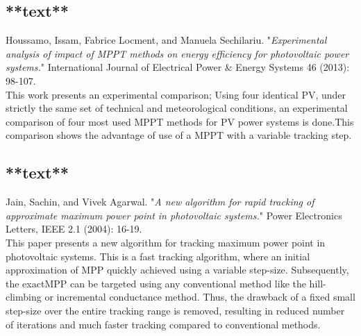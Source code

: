 





\subsection{**text**\cite{houssamo2013experimental}}

Houssamo, Issam, Fabrice Locment, and Manuela Sechilariu. "\textit{Experimental analysis of impact of MPPT methods on energy efficiency for photovoltaic power systems.}" International Journal of Electrical Power \& Energy Systems 46 (2013): 98-107.\\

This work presents an experimental comparison; Using four identical PV, under strictly the same set of technical and meteorological conditions, an experimental comparison  of four most used MPPT methods for PV power systems is done.This comparison shows the advantage of use of a MPPT with a variable tracking step.\\  

\subsection{**text**\cite{jain2004new}}
Jain, Sachin, and Vivek Agarwal. "\textit{A new algorithm for rapid tracking of approximate maximum power point in photovoltaic systems.}" Power Electronics Letters, IEEE 2.1 (2004): 16-19.\\

This paper presents a new algorithm for tracking maximum power point in photovoltaic systems. This is a fast tracking algorithm, where an initial approximation of \ac{MPP} quickly achieved using a variable step-size. Subsequently, the exact\ac{MPP} can be targeted using any conventional method like the hill-climbing or incremental conductance method. Thus, the drawback of a fixed small step-size over the entire tracking range is removed, resulting in reduced number of iterations and much faster tracking compared to conventional methods. \\

